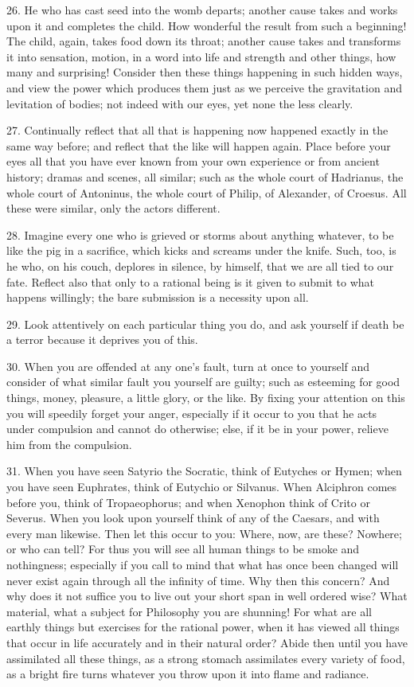 \documentclass{book}
\begin{document}
26. He who has cast seed into the womb departs; another cause takes
and works upon it and completes the child. How wonderful the result
from such a beginning! The child, again, takes food down its throat;
another cause takes and transforms it into sensation, motion, in a
word into life and strength and other things, how many and surprising!
Consider then these things happening in such hidden ways, and view the
power which produces them just as we perceive the gravitation and
levitation of bodies; not indeed with our eyes, yet none the less
clearly.

27. Continually reflect that all that is happening now happened
exactly in the same way before; and reflect that the like will happen
again. Place before your eyes all that you have ever known from your
own experience or from ancient history; dramas and scenes, all
similar; such as the whole court of Hadrianus, the whole court of
Antoninus, the whole court of Philip, of Alexander, of Croesus. All
these were similar, only the actors different.

28. Imagine every one who is grieved or storms about anything
whatever, to be like the pig in a sacrifice, which kicks and screams
under the knife. Such, too, is he who, on his couch, deplores in
silence, by himself, that we are all tied to our fate. Reflect also
that only to a rational being is it given to submit to what happens
willingly; the bare submission is a necessity upon all.

29. Look attentively on each particular thing you do, and ask yourself
if death be a terror because it deprives you of this.

30. When you are offended at any one's fault, turn at once to yourself
and consider of what similar fault you yourself are guilty; such as
esteeming for good things, money, pleasure, a little glory, or the
like. By fixing your attention on this you will speedily forget your
anger, especially if it occur to you that he acts under compulsion and
cannot do otherwise; else, if it be in your power, relieve him from
the compulsion.

31. When you have seen Satyrio the Socratic, think of Eutyches or
Hymen; when you have seen Euphrates, think of Eutychio or
Silvanus. When Alciphron comes before you, think of Tropaeophorus; and
when Xenophon think of Crito or Severus. When you look upon yourself
think of any of the Caesars, and with every man likewise. Then let
this occur to you: Where, now, are these? Nowhere; or who can tell?
For thus you will see all human things to be smoke and nothingness;
especially if you call to mind that what has once been changed will
never exist again through all the infinity of time. Why then this
concern? And why does it not suffice you to live out your short span
in well ordered wise? What material, what a subject for Philosophy you
are shunning! For what are all earthly things but exercises for the
rational power, when it has viewed all things that occur in life
accurately and in their natural order? Abide then until you have
assimilated all these things, as a strong stomach assimilates every
variety of food, as a bright fire turns whatever you throw upon it
into flame and radiance.
\end{document}

